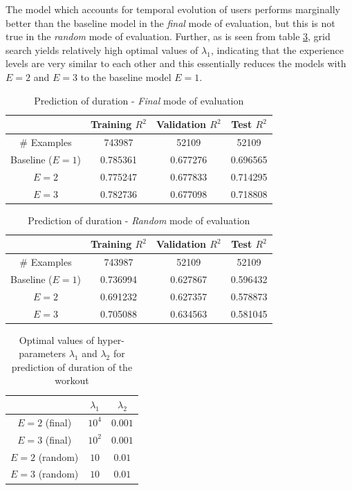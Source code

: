 \documentclass{acm_proc_article-sp}
\begin{document}
The model which accounts for temporal evolution of users performs marginally better than the baseline model in the \emph{final} mode of evaluation, but this is not true in the \emph{random} mode of evaluation. Further, as is seen from table \ref{tableDurationHyperparams}, grid search yields relatively high optimal values of $\lambda_1$, indicating that the experience levels are very similar to each other and this essentially reduces the models with $E = 2$ and $E = 3$ to the baseline model $E = 1$.

\begin{table}[H]
\centering
\begin{tabular}{|c|c|c|c|} \hline
& Training $R^2$ & Validation $R^2$ & Test $R^2$ \\ \hline
\# Examples & 743987 & 52109 & 52109 \\ \hline
Baseline ($E = 1$) & 0.785361 & 0.677276 & 0.696565 \\ \hline
$E = 2$ & 0.775247 & 0.677833 & 0.714295 \\ \hline
$E = 3$ & 0.782736 & 0.677098 & 0.718808 \\ \hline
\end{tabular}
\caption{Prediction of duration - \emph{Final} mode of evaluation }
\label{tableDurationFinal}
\end{table}

\begin{table}[H]
\centering
\begin{tabular}{|c|c|c|c|} \hline
& Training $R^2$ & Validation $R^2$ & Test $R^2$ \\ \hline
\# Examples & 743987 & 52109 & 52109  \\ \hline
Baseline ($E = 1$) & 0.736994 & 0.627867 & 0.596432 \\ \hline
$E = 2$ & 0.691232 & 0.627357 & 0.578873 \\ \hline
$E = 3$ & 0.705088 & 0.634563 & 0.581045 \\ \hline
\end{tabular}
\caption{Prediction of duration - \emph{Random} mode of evaluation }
\label{tableDurationRandom}
\end{table}

\begin{table}[H]
\centering
\begin{tabular}{|c|c|c|} \hline
& $\lambda_1$ & $\lambda_2$ \\ \hline
$E = 2$ (final) & $10^4$ & $0.001$ \\ \hline
$E = 3$ (final) & $10^2$ & $0.001$ \\ \hline
$E = 2$ (random) & $10$ & $0.01$ \\ \hline
$E = 3$ (random) & $10$ & $0.01$ \\ \hline
\end{tabular}
\caption{Optimal values of hyper-parameters $\lambda_1$ and $\lambda_2$ for prediction of duration of the workout}
\label{tableDurationHyperparams}
\end{table}
\end{document}
